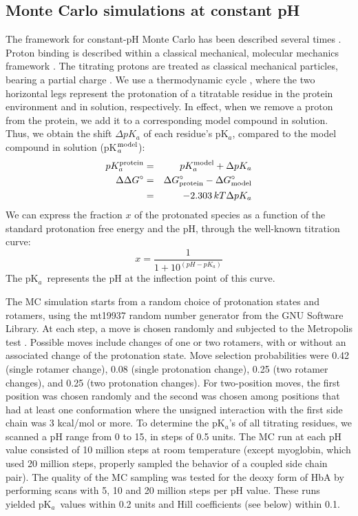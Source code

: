 \documentclass[a4paper,12pt]{article}
\newcommand{\pk}{pK$_a$}
\begin{document}
\subsection{Monte Carlo simulations at constant pH}
The framework for constant-pH Monte Carlo has been described several times \cite{Baptista97,Lee04,Mongan04,Georgescu02,
Aleksandrov10b,Polydorides13}. Proton binding is described within a classical mechanical, molecular mechanics framework
\cite{Warshel86,Bashford90,Antosiewicz94,Schaefer98b,Sham98,Simonson04,Alexov11}. The titrating protons are treated as
classical mechanical particles, bearing a partial charge \cite{Cornell95}. We use a thermodynamic cycle \cite{Warshel86},
where the two horizontal legs represent the protonation of a titratable residue in the protein environment and in solution,
respectively. In effect, when we remove a proton from the protein, we add it to a corresponding model compound in solution.
Thus, we obtain the shift $\Delta pK_a$ of each residue's \pk, compared to the model compound in solution (pK$_a^{\rm model}$):
\begin{eqnarray}
pK_a^{\rm protein} &=& pK_a^{\rm model} + \Delta pK_a  \\
\Delta \Delta G^{\circ} & = & \Delta G_{\rm protein}^{\circ} - \Delta G_{\rm model}^{\circ} \nonumber  \\ 
                & = & -2.303 \, kT \Delta pK_a 
\end{eqnarray}
We can express the fraction $x$ of the protonated species as a function of the standard protonation free energy and
the pH, through the well-known titration curve:
\begin{equation}\label{eq:tcurve}
 x = \frac{1}{1+10^{(pH-pK_a)}} 
\end{equation}
The \pk\ represents the pH at the inflection point of this curve.

The MC simulation starts from a random choice of protonation states and rotamers, using the mt19937 random number
generator from the GNU Software Library. At each step, a move is chosen randomly and subjected to the Metropolis
test \cite{Polydorides13,AllenBK,FrenkelBK}. Possible moves include changes of one or two rotamers, with or without
an associated change of the protonation state. Move selection probabilities were 0.42 (single rotamer change), 0.08
(single protonation change), 0.25 (two rotamer changes), and 0.25 (two protonation changes). For two-position moves,
the first position was chosen randomly and the second was chosen among positions that had at least one conformation
where the unsigned interaction with the first side chain was 3 kcal/mol or more. To determine the \pk's of all titrating
residues, we scanned a pH range from 0 to 15, in steps of 0.5 units. The MC run at each pH value consisted of 10 million
steps at room temperature (except myoglobin, which used 20 million steps, properly sampled the behavior of a coupled
side chain pair). The quality of the MC sampling was tested for the deoxy form of HbA by performing scans with 5, 10
and 20 million steps per pH value. These runs yielded \pk\ values within 0.2 units and Hill coefficients (see below)
within 0.1.
\end{document}
